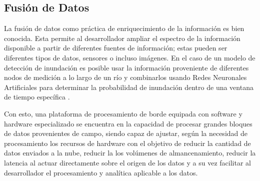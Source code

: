 \subsection{Fusión de Datos}

La fusión de datos como práctica de enriquecimiento de la información es bien conocida. Esta permite al desarrollador ampliar el espectro de la información disponible a partir de diferentes fuentes de información; estas pueden ser diferentes tipos de datos, sensores o incluso imágenes. En el caso de un modelo de detección de inundación es posible usar la información proveniente de diferentes nodos de medición a lo largo de un río y combinarlos usando Redes Neuronales Artificiales para determinar la probabilidad de inundación dentro de una ventana de tiempo específica \cite{ANN1,ANN2,ANN3}.

Con esto, una plataforma de procesamiento de borde equipada con software y hardware especializado \iffalse como el propuesto en este proyecto \fi se encuentra en la capacidad de procesar grandes bloques de datos provenientes de campo, siendo capaz de ajustar, según la necesidad de procesamiento los recursos de hardware con el objetivo de reducir la cantidad de datos enviados a la nube, reducir la los volúmenes de almancenamiento, reducir la latencia al actuar directamente sobre el origen de los datos y a su vez facilitar al desarrollador el procesamiento y analítica aplicable a los datos.